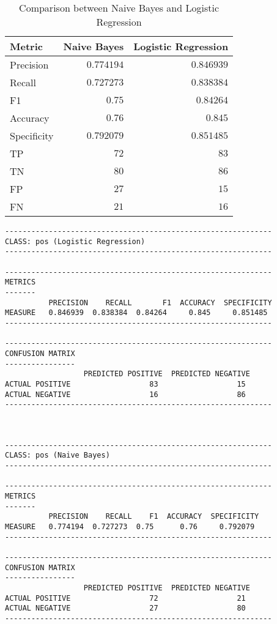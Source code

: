 \begin{table}[H]
  \centering
  \begin{tabular}{l | r | r}
    \textbf{Metric} & \textbf{Naive Bayes} & \textbf{Logistic Regression} \\
    \midrule
    Precision & $0.774194$ & $0.846939$ \\
    Recall & $0.727273$ & $0.838384$ \\
    F1 & $0.75$ & $0.84264$ \\
    Accuracy & $0.76$ & $0.845$ \\
    Specificity & $0.792079$ & $0.851485$ \\
    TP & $72$ & $83$ \\
    TN & $80$ & $86$ \\
    FP & $27$ & $15$ \\
    FN & $21$ & $16$ \\
    \toprule
  \end{tabular}
  \caption{Comparison between Naive Bayes and Logistic Regression}
\end{table}

\vskip 0.2in
\begin{verbatim}
-------------------------------------------------------------
CLASS: pos (Logistic Regression)
-------------------------------------------------------------

-------------------------------------------------------------
METRICS
-------
          PRECISION    RECALL       F1  ACCURACY  SPECIFICITY
MEASURE   0.846939  0.838384  0.84264     0.845     0.851485
-------------------------------------------------------------

-------------------------------------------------------------
CONFUSION MATRIX
----------------
                  PREDICTED POSITIVE  PREDICTED NEGATIVE
ACTUAL POSITIVE                  83                  15
ACTUAL NEGATIVE                  16                  86
-------------------------------------------------------------



-------------------------------------------------------------
CLASS: pos (Naive Bayes)
-------------------------------------------------------------

-------------------------------------------------------------
METRICS
-------
          PRECISION    RECALL    F1  ACCURACY  SPECIFICITY
MEASURE   0.774194  0.727273  0.75      0.76     0.792079
-------------------------------------------------------------

-------------------------------------------------------------
CONFUSION MATRIX
----------------
                  PREDICTED POSITIVE  PREDICTED NEGATIVE
ACTUAL POSITIVE                  72                  21
ACTUAL NEGATIVE                  27                  80
-------------------------------------------------------------
\end{verbatim}

